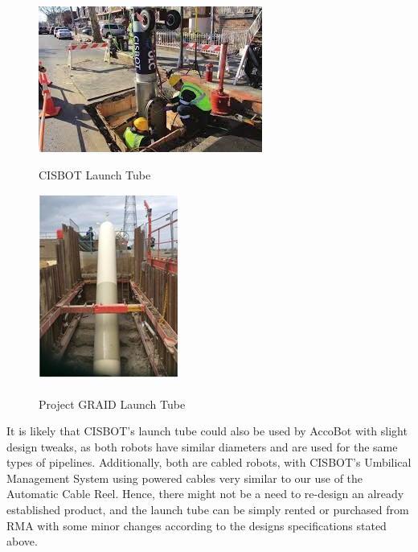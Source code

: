 \documentclass[11pt]{article}		%
\newlength{\imageheight}	 %
\newcommand{\supercite}[1]{\textsuperscript{\cite{#1}}}		%
\begin{document}
		\begin{figure}[h]
				\centering
				\begin{multicols}{2}
				    \includegraphics[height = \imageheight]{CISBOTlaunchtube.jpg}
    				\caption{CISBOT Launch Tube \cite{CISBOT_project}}
    				\label{cisbotlaunchtube}
    				\columnbreak
    				\includegraphics[height = \imageheight]{GRAIDlaunchtube.jpg}
    				\caption{Project GRAID Launch Tube\supercite{GRAID}}
    				\label{graidlaunchtube}
				\end{multicols}
			\end{figure}
			\vspace{-0.5cm}
	It is likely that CISBOT’s launch tube could also be used by AccoBot with slight design tweaks, as both robots have similar diameters and are used for the same types of pipelines. Additionally, both are cabled robots, with CISBOT’s Umbilical Management System using powered cables very similar to our use of the Automatic Cable Reel. Hence, there might not be a  need to re-design an already established product, and the launch tube can be simply rented or purchased from RMA with some minor changes according to the designs specifications stated above. 
\end{document}
